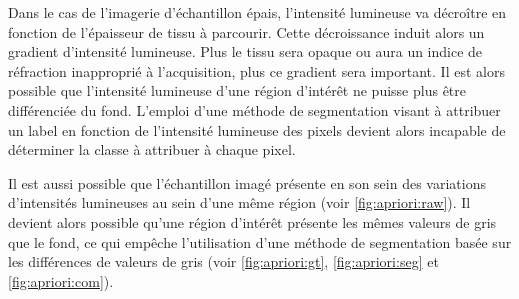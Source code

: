 \documentclass[\main/main.tex]{subfiles}
\begin{document}
%
Dans le cas de l'imagerie d'échantillon épais, l'intensité lumineuse va décroître en fonction de l'épaisseur de tissu à parcourir.
%
Cette décroissance induit alors un gradient d'intensité lumineuse.
%
Plus le tissu sera opaque ou aura un indice de réfraction inapproprié à l'acquisition, plus ce gradient sera important.
%
Il est alors possible que l'intensité lumineuse d'une région d'intérêt ne puisse plus être différenciée du fond.
%
L'emploi d'une méthode de segmentation visant à attribuer un label en fonction de l'intensité lumineuse des pixels devient alors incapable de déterminer la classe à attribuer à chaque pixel.

%
Il est aussi possible que l'échantillon imagé présente en son sein des variations d'intensités lumineuses au sein d'une même région (voir \autoref{fig:apriori:raw}).
%
Il devient alors possible qu'une région d'intérêt présente les mêmes valeurs de gris que le fond, ce qui empêche l'utilisation d'une méthode de segmentation basée sur les différences de valeurs de gris (voir \autoref{fig:apriori:gt}, \autoref{fig:apriori:seg} et \autoref{fig:apriori:com}).
\end{document}
